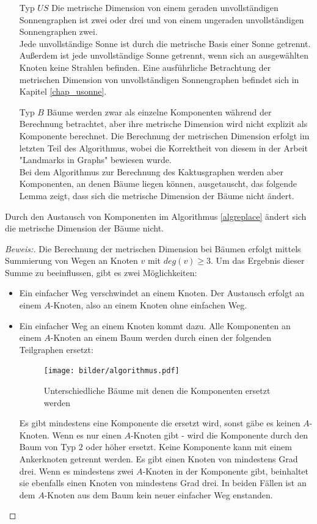 \begin{itemize}
\item[Typ $US$]
Die metrische Dimension von einem geraden unvollständigen Sonnengraphen ist zwei oder drei und von einem ungeraden unvollständigen Sonnengraphen zwei.\\
Jede unvollständige Sonne ist durch die metrische Basis einer Sonne getrennt. Außerdem ist jede unvollständige Sonne getrennt, wenn sich an ausgewählten Knoten keine Strahlen befinden. Eine ausführliche Betrachtung der metrischen Dimension von unvollständigen Sonnengraphen befindet sich in Kapitel \ref{chap_usonne}.
\item[Typ $B$]
Bäume werden zwar als einzelne Komponenten während der Berechnung betrachtet, aber ihre metrische Dimension wird nicht explizit als Komponente berechnet. Die Berechnung der metrischen Dimension erfolgt im letzten Teil des Algorithmus, wobei die Korrektheit von diesem in der Arbeit "Landmarks in Graphs" \cite{landmarks} bewiesen wurde.\\
Bei dem Algorithmus zur Berechnung des Kaktusgraphen werden aber Komponenten, an denen Bäume liegen können, ausgetauscht, das folgende Lemma zeigt, dass sich die metrische Dimension der Bäume nicht ändert.
\end{itemize}
\begin{lem}
Durch den Austausch von Komponenten im Algorithmus \ref{algreplace} ändert sich die metrische Dimension der Bäume nicht.
\end{lem}\vspace{-6mm}
\begin{proof}[Beweis:]
Die Berechnung der metrischen Dimension bei Bäumen erfolgt mittels Summierung von Wegen an Knoten $v$ mit $deg(v)\geq 3$. Um das Ergebnis dieser Summe zu beeinflussen, gibt es zwei Möglichkeiten:
\begin{itemize}
\item Ein einfacher Weg verschwindet an einem Knoten. Der Austausch erfolgt an einem $A$-Knoten, also an einem Knoten ohne einfachen Weg. 
\item Ein einfacher Weg an einem Knoten kommt dazu. Alle Komponenten an einem $A$-Knoten an einem Baum werden durch einen der folgenden Teilgraphen ersetzt:
\vspace{-4mm}
\begin{figure}[h!]
		\centering 		 
   \texttt{[image: bilder/algorithmus.pdf]}
	\caption{Unterschiedliche Bäume mit denen die Komponenten ersetzt werden}
  	 \end{figure}
  	 \vspace{-3mm}
Es gibt mindestens eine Komponente die ersetzt wird, sonst gäbe es keinen $A$-Knoten. Wenn es nur einen $A$-Knoten gibt - wird die Komponente durch den Baum von Typ $2$ oder höher ersetzt. Keine Komponente kann mit einem Ankerknoten getrennt werden. Es gibt einen Knoten von mindestens Grad drei. Wenn es mindestens zwei $A$-Knoten in der Komponente gibt, beinhaltet sie ebenfalls einen Knoten von mindestens Grad drei. In beiden Fällen ist an dem $A$-Knoten aus dem Baum kein neuer einfacher Weg enstanden.
\end{itemize}
\vspace{-1mm}
\end{proof}
\vspace{-12mm}
